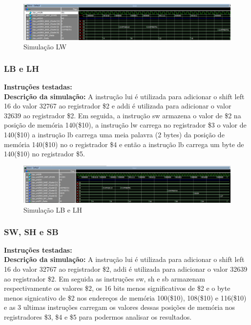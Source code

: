 \begin{figure}[htbp!]
\centering
\includegraphics[width=1\textwidth]{figure/simulacao_lw.png}
\caption{Simulação LW} 
\label{fig:imagem_massa}
\end{figure}

\newpage
\subsubsection{LB e LH}
\textbf{Instruções testadas:}
 \\

\textbf{Descrição da simulação:} A instrução lui é utilizada para adicionar o shift left 16 do valor 32767 ao registrador \$2 e addi é utilizada para adicionar o valor 32639 ao registrador \$2. Em seguida, a instrução sw armazena o valor de \$2 na posição de memória 140(\$10), a instrução lw carrega no registrador \$3 o valor de 140(\$10) a instrução lb carrega uma meia palavra (2 bytes) da posição de memória 140(\$10) no o registrador \$4 e então a instrução lb carrega um byte de 140(\$10) no registrador \$5.  \\

\begin{figure}[htbp!]
\centering
\includegraphics[width=1\textwidth]{figure/simulacao_lb_lh.png}
\caption{Simulação LB e LH} 
\label{fig:imagem_massa}
\end{figure}

\subsubsection{SW, SH e SB}
\textbf{Instruções testadas:}
 \\

\textbf{Descrição da simulação:} A instrução lui é utilizada para adicionar o shift left 16 do valor 32767 ao registrador \$2, addi é utilizada para adicionar o valor 32639 ao registrador \$2. Em seguida as instruções sw, sh e sb armazenam respectivamente os valores \$2, os 16 bits menos significativos de \$2 e o byte menos signicativo de \$2 nos endereços de memória  100(\$10), 108(\$10) e 116(\$10) e as 3 ultimas instruções carregam os valores dessas posições de memória nos registradores \$3, \$4 e \$5 para podermos analisar os resultados.\\

